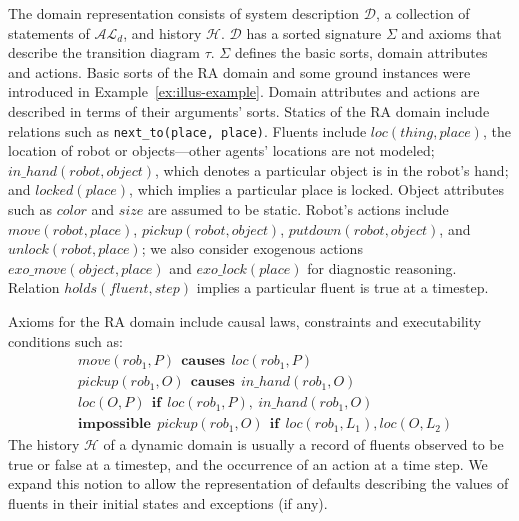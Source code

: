 \documentclass[letterpaper, 10 pt, conference]{ieeeconf}  %
\newcommand{\stt}[1]{{\small\texttt{#1}}}
\begin{document}
The domain representation consists of system description
$\mathcal{D}$, a collection of statements of $\mathcal{AL}_d$, and
history $\mathcal{H}$. $\mathcal{D}$ has a sorted signature $\Sigma$
and axioms that describe the transition diagram $\tau$. $\Sigma$
defines the basic sorts, domain attributes and actions. Basic sorts of
the RA domain and some ground instances were introduced in
Example~\ref{ex:illus-example}. Domain attributes and actions are
described in terms of their arguments' sorts. Statics of the RA domain
include relations such as \stt{next\_to(place, place)}. Fluents
include $loc(thing, place)$, the location of robot or objects---other
agents' locations are not modeled; $in\_hand(robot, object)$, which
denotes a particular object is in the robot's hand; and
$locked(place)$, which implies a particular place is locked.  Object
attributes such as $color$ and $size$ are assumed to be static.
Robot's actions include $move(robot, place)$, $pickup(robot, object)$,
$putdown(robot, object)$, and $unlock(robot, place)$; we also consider
exogenous actions $exo\_move(object, place)$ and $exo\_lock(place)$
for diagnostic reasoning. Relation $holds(fluent, step)$ implies a
particular fluent is true at a timestep.

Axioms for the RA domain include causal laws, constraints and
executability conditions such as:
\begin{align*}
  &move(rob_1, P)~~\mathbf{causes}~~loc(rob_1, P) \\
  &pickup(rob_1, O)~~\mathbf{causes}~~in\_hand(rob_1, O) \\
  &loc(O, P)~~\mathbf{if}~~ loc(rob_1, P),~in\_hand(rob_1, O)\\
  &\mathbf{impossible}~~pickup(rob_1, O)~~\mathbf{if}~~loc(rob_1,
  L_1), loc(O, L_2)
\end{align*}
The history $\mathcal{H}$ of a dynamic domain is usually a record of
fluents observed to be true or false at a timestep, and the occurrence
of an action at a time step. We expand this notion to allow the
representation of defaults describing the values of fluents in their
initial states and exceptions (if any).
\end{document}
